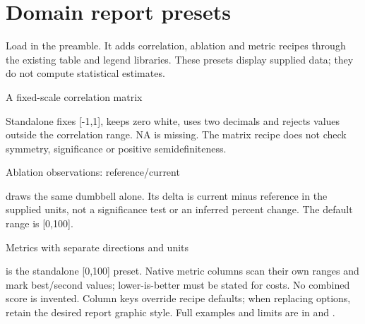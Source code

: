 \section{Domain report presets}
Load  in the preamble. It adds correlation,
ablation and metric recipes through the existing table and legend libraries.
These presets display supplied data; they do not compute statistical estimates.
\begin{demo}{A fixed-scale correlation matrix}
\begin{center}
\begin{gradtable}[align=c,header align=c,style=correlation]
\end{gradtable}
\end{center}
\end{demo}
Standalone  fixes [-1,1], keeps zero white, uses two
decimals and rejects values outside the correlation range. NA is missing.
The matrix recipe does not check symmetry, significance or positive semidefiniteness.
\begin{demo}{Ablation observations: reference/current}
\begin{center}
\begin{gradtable}[align=c,header align=c,style=ablation]
\end{gradtable}
\end{center}
\end{demo}
 draws the same dumbbell alone.
Its delta is current minus reference in the supplied units, not a significance
test or an inferred percent change. The default range is [0,100].
\begin{demo}{Metrics with separate directions and units}
\begin{center}
\begin{gradtable}[align=c,header align=c,style=metrics,width=\linewidth]
\end{gradtable}
\end{center}
\end{demo}
 is the standalone [0,100] preset. Native metric columns
scan their own ranges and mark best/second values; lower-is-better must be stated
for costs. No combined score is invented. Column keys override recipe defaults;
when replacing options, retain the desired report graphic style. Full examples
and limits are in  and .
